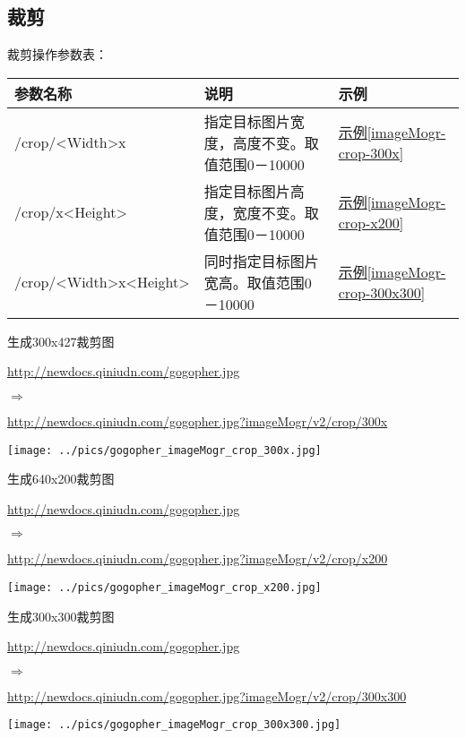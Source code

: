 \documentclass[11pt, oneside]{book}
\newcommand{\qsym}[1]{
\footnotesize
\noindent
#1\par
\normalsize
}
\newcommand{\qpara}[1]{
\vspace{0.3em}
\noindent
#1\par
\vspace{0.3em}
}
\newcommand{\qsamplelink}[1]{
\vspace{0.2em}
\noindent
#1\par
\vspace{0.1em}
}
\newcommand{\qurl}[1]{\footnotesize\url{#1}\normalsize}
\newcommand{\qtable}[1]{\footnotesize\vspace{0.5em}#1\vspace{0.5em}\normalsize}
\newcommand{\qsample}[1]{\hyperref[#1]{示例\ref*{#1}}}
\begin{document}
\clearpage

\subsection{裁剪}

\qpara{裁剪操作参数表：}
\qtable{
\label{crop-spec}
\begin{tabular}[t]{|l|p{20em}|p{5em}|}
\hline
参数名称 & 说明 & 示例 \\
\hline
/crop/\textless Width\textgreater x & 指定目标图片宽度，高度不变。取值范围0－10000 & \qsample{imageMogr-crop-300x} \\
\hline
/crop/x\textless Height\textgreater & 指定目标图片高度，宽度不变。取值范围0－10000 & \qsample{imageMogr-crop-x200} \\
\hline
/crop/\textless Width\textgreater x\textless Height\textgreater & 同时指定目标图片宽高。取值范围0－10000 & \qsample{imageMogr-crop-300x300} \\
\hline
\end{tabular}
}

\begin{sample}
  \caption{生成300x427裁剪图}
    \qsamplelink{\qurl{http://newdocs.qiniudn.com/gogopher.jpg}}
    \qsym{$\Rightarrow$}
    \qsamplelink{\qurl{http://newdocs.qiniudn.com/gogopher.jpg?imageMogr/v2/crop/300x}}

    \begin{center}
      \texttt{[image: ../pics/gogopher\_imageMogr\_crop\_300x.jpg]}
    \end{center}
  \label{imageMogr-crop-300x}
\end{sample}

\begin{sample}
  \caption{生成640x200裁剪图}
    \qsamplelink{\qurl{http://newdocs.qiniudn.com/gogopher.jpg}}
    \qsym{$\Rightarrow$}
    \qsamplelink{\qurl{http://newdocs.qiniudn.com/gogopher.jpg?imageMogr/v2/crop/x200}}

    \begin{center}
      \texttt{[image: ../pics/gogopher\_imageMogr\_crop\_x200.jpg]}
    \end{center}
  \label{imageMogr-crop-x200}
\end{sample}

\begin{sample}
  \caption{生成300x300裁剪图}
    \qsamplelink{\qurl{http://newdocs.qiniudn.com/gogopher.jpg}}
    \qsym{$\Rightarrow$}
    \qsamplelink{\qurl{http://newdocs.qiniudn.com/gogopher.jpg?imageMogr/v2/crop/300x300}}

    \begin{center}
      \texttt{[image: ../pics/gogopher\_imageMogr\_crop\_300x300.jpg]}
    \end{center}
  \label{imageMogr-crop-300x300}
\end{sample}
\end{document}
